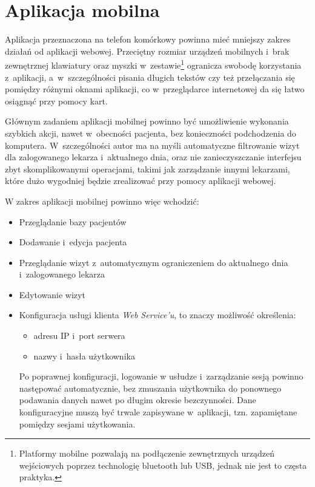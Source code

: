 \documentclass[11pt]{aghdpl}
\begin{document}
\section{Aplikacja mobilna}

Aplikacja przeznaczona na telefon komórkowy powinna mieć mniejszy zakres działań od aplikacji webowej. Przeciętny rozmiar urządzeń mobilnych i~brak zewnętrznej klawiatury oraz myszki w~zestawie\footnote{Platformy mobilne pozwalają na podłączenie zewnętrznych urządzeń wejściowych poprzez technologię bluetooth lub USB, jednak nie jest to częsta praktyka.} ogranicza swobodę korzystania z~aplikacji, a~w~szczególności pisania długich tekstów czy też przełączania się pomiędzy różnymi oknami aplikacji, co w~przeglądarce internetowej da się łatwo osiągnąć przy pomocy kart.

Głównym zadaniem aplikacji mobilnej powinno być umożliwienie wykonania szybkich akcji, nawet w~obecności pacjenta, bez konieczności podchodzenia do komputera. W~szczególności autor ma na myśli automatyczne filtrowanie wizyt dla zalogowanego lekarza i~aktualnego dnia, oraz nie zanieczyszczanie interfejsu zbyt skomplikowanymi operacjami, takimi jak zarządzanie innymi lekarzami, które dużo wygodniej będzie zrealizować przy pomocy aplikacji webowej.

W zakres aplikacji mobilnej powinno więc wchodzić:

\begin{itemize}
	\item Przeglądanie bazy pacjentów
	\item Dodawanie i~edycja pacjenta
	\item Przeglądanie wizyt z~automatycznym ograniczeniem do aktualnego dnia i~zalogowanego lekarza
	\item Edytowanie wizyt
	\item Konfiguracja usługi klienta \emph{Web Service'u}, to znaczy możliwość określenia:
	\begin{itemize}
		\item adresu IP i~port serwera
		\item nazwy i~hasła użytkownika
	\end{itemize}
	Po poprawnej konfiguracji, logowanie w usłudze i~zarządzanie sesją powinno następować automatycznie, bez zmuszania użytkownika do ponownego podawania danych nawet po długim okresie bezczynności. Dane konfiguracyjne muszą być trwale zapisywane w~aplikacji, tzn. zapamiętane pomiędzy sesjami użytkowania.
\end{itemize}
\end{document}
